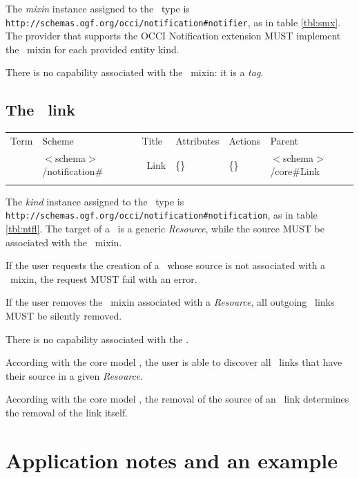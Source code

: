 \documentclass[10pt,a4paper]{article}
\begin{document}
The {\em mixin} instance assigned to the \smx\ type is {\tt http://schemas.ogf.org/occi/notification\#notifier}, as in table \ref{tbl:smx}. The provider that supports the OCCI Notification extension MUST implement the \smx\ mixin for each provided entity kind.

There is no capability associated with the \smx\ mixin: it is a {\em tag}.

\subsection{The \ntfl\ link} 

 {
	\begin{tabular}{llllll}
	\toprule
	Term & Scheme & Title & Attributes & Actions & Parent \\
	\colrule
	\ntfl &  $<$schema$>$/notification\# & \ntfl\ Link
	& \{\} & \{\} & $<$schema$>$/core\#Link\\
	\botrule
	\end{tabular}
}

The {\em kind} instance assigned to the \ntfl\ type is {\tt http://schemas.ogf.org/occi/notification\#notification}, as in table \ref{tbl:ntfl}. The target of a \ntfl\ is a generic {\em Resource}, while the source MUST be associated with the \smx\ mixin. 

If the user requests the creation of a \ntfl\ whose source is not associated with a \smx\ mixin, the request MUST fail with an error.

If the user removes the \ntfl\ mixin associated with a {\em Resource}, all outgoing \ntfl\ links MUST be silently removed.

There is no capability associated with the \ntfl.

According with the core model \cite{occi:core}, the user is able to discover all \ntfl\ links that have their source in a given {\em Resource}.

According with the core model \cite{occi:core}, the removal of the source of an \ntfl\ link determines the removal of the link itself.

\section{Application notes and an example}
\end{document}

